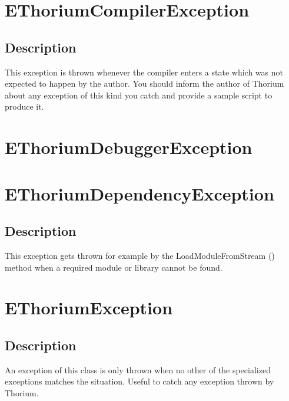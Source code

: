 \section{EThoriumCompilerException}
\label{thoriumcorepkg:thorium:ethoriumcompilerexception}
\subsection{Description}
This exception is thrown whenever the compiler enters a state which was not expected to happen by the author. You should inform the author of Thorium about any exception of this kind you catch and provide a sample script to produce it.%
\section{EThoriumDebuggerException}
\label{thoriumcorepkg:thorium:ethoriumdebuggerexception}
\section{EThoriumDependencyException}
\label{thoriumcorepkg:thorium:ethoriumdependencyexception}
\subsection{Description}
This exception gets thrown for example by the LoadModuleFromStream (\pageref{thoriumcorepkg:thorium:tthorium:loadmodulefromstream}) method when a required module or library cannot be found.%
\section{EThoriumException}
\label{thoriumcorepkg:thorium:ethoriumexception}
\subsection{Description}
An exception of this class is only thrown when no other of the specialized exceptions matches the situation. Useful to catch any exception thrown by Thorium.%

